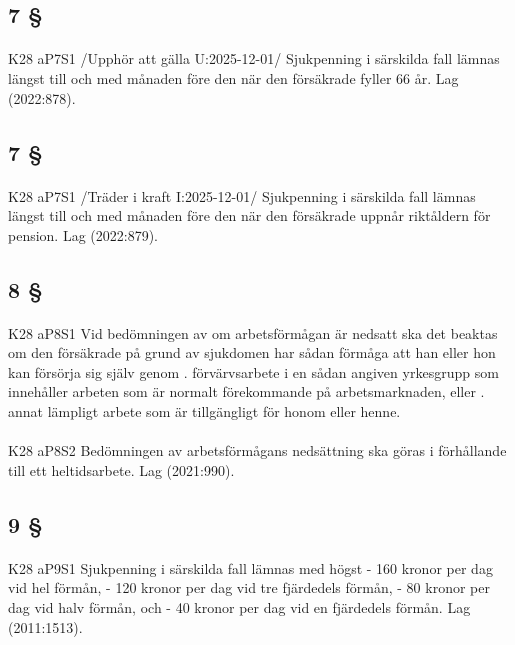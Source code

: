 \documentclass[a4paper,notitlepage,openany,10pt]{book}
\begin{document}
\subsection*{7 §}
\paragraph*{}
{\tiny K28 aP7S1}
/Upphör att gälla U:2025-12-01/
Sjukpenning i särskilda fall lämnas längst till och med månaden före den när den försäkrade fyller 66 år.
Lag (2022:878).
\subsection*{7 §}
\paragraph*{}
{\tiny K28 aP7S1}
/Träder i kraft I:2025-12-01/
Sjukpenning i särskilda fall lämnas längst till och med månaden före den när den försäkrade uppnår riktåldern för pension.
Lag (2022:879).
\subsection*{8 §}
\paragraph*{}
{\tiny K28 aP8S1}
Vid bedömningen av om arbetsförmågan är nedsatt ska det beaktas om den försäkrade på grund av sjukdomen har sådan förmåga att han eller hon kan försörja sig själv genom
. förvärvsarbete i en sådan angiven yrkesgrupp som innehåller arbeten som är normalt förekommande på arbetsmarknaden, eller
. annat lämpligt arbete som är tillgängligt för honom eller henne.
\paragraph*{}
{\tiny K28 aP8S2}
Bedömningen av arbetsförmågans nedsättning ska göras i förhållande till ett heltidsarbete.
Lag (2021:990).
\subsection*{9 §}
\paragraph*{}
{\tiny K28 aP9S1}
Sjukpenning i särskilda fall lämnas med högst
\newline - 160 kronor per dag vid hel förmån,
\newline - 120 kronor per dag vid tre fjärdedels förmån,
\newline - 80 kronor per dag vid halv förmån, och
\newline - 40 kronor per dag vid en fjärdedels förmån.
Lag (2011:1513).
\end{document}
